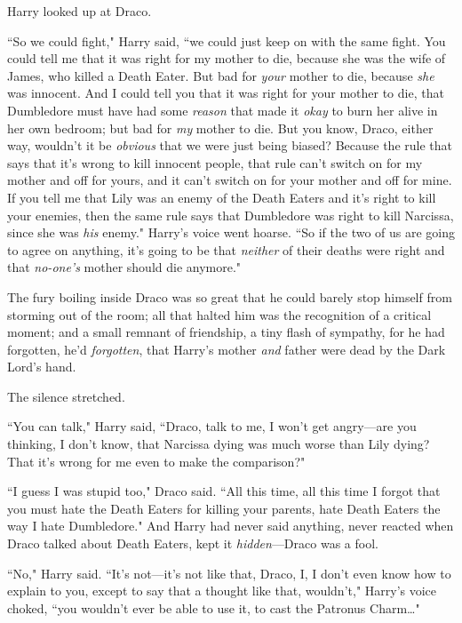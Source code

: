 Harry looked up at Draco.

``So we could fight," Harry said, ``we could just keep on with the same fight. You could tell me that it was right for my mother to die, because she was the wife of James, who killed a Death Eater. But bad for \emph{your} mother to die, because \emph{she} was innocent. And I could tell you that it was right for your mother to die, that Dumbledore must have had some \emph{reason} that made it \emph{okay} to burn her alive in her own bedroom; but bad for \emph{my} mother to die. But you know, Draco, either way, wouldn't it be \emph{obvious} that we were just being biased? Because the rule that says that it's wrong to kill innocent people, that rule can't switch on for my mother and off for yours, and it can't switch on for your mother and off for mine. If you tell me that Lily was an enemy of the Death Eaters and it's right to kill your enemies, then the same rule says that Dumbledore was right to kill Narcissa, since she was \emph{his} enemy." Harry's voice went hoarse. ``So if the two of us are going to agree on anything, it's going to be that \emph{neither} of their deaths were right and that \emph{no-one's} mother should die anymore."

\later

The fury boiling inside Draco was so great that he could barely stop himself from storming out of the room; all that halted him was the recognition of a critical moment; and a small remnant of friendship, a tiny flash of sympathy, for he had forgotten, he'd \emph{forgotten}, that Harry's mother \emph{and} father were dead by the Dark Lord's hand.

The silence stretched.

``You can talk," Harry said, ``Draco, talk to me, I won't get angry—are you thinking, I don't know, that Narcissa dying was much worse than Lily dying? That it's wrong for me even to make the comparison?"

``I guess I was stupid too," Draco said. ``All this time, all this time I forgot that you must hate the Death Eaters for killing your parents, hate Death Eaters the way I hate Dumbledore." And Harry had never said anything, never reacted when Draco talked about Death Eaters, kept it \emph{hidden}—Draco was a fool.

``No," Harry said. ``It's not—it's not like that, Draco, I, I don't even know how to explain to you, except to say that a thought like that, wouldn't," Harry's voice choked, ``you wouldn't ever be able to use it, to cast the Patronus Charm{\ldots}"

